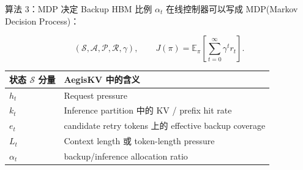 \documentclass[aspectratio=43]{beamer}
\begin{document}
\begin{frame}{算法 3：MDP 决定 Backup HBM 比例 $\alpha_t$}
  \small
  在线控制器可以写成 MDP(Markov Decision Process)\cite{yu2026poolcachesadaptivehbm}：

  \vspace{0.04cm}
  \[
    (\mathcal{S},\mathcal{A},\mathcal{P},\mathcal{R},\gamma),
    \qquad
    J(\pi)=\mathbb{E}_{\pi}\left[\sum_{t=0}^{\infty}\gamma^t r_t\right].
  \]

  \vspace{-0.05cm}
  \scriptsize
  \renewcommand{\arraystretch}{1.10}
  \begin{tabular}{p{}p{}}
    \toprule
    状态 $\mathcal{S}$ 分量 & AegisKV 中的含义 \\
    \midrule
    $h_t$ & Request pressure \\
    $k_t$ & Inference partition 中的 KV / prefix hit rate \\
    $e_t$ & candidate retry tokens 上的 effective backup coverage \\
    $L_t$ & Context length 或 token-length pressure \\
    $\alpha_t$ & backup/inference allocation ratio \\
    \bottomrule
  \end{tabular}

\end{frame}
\end{document}
